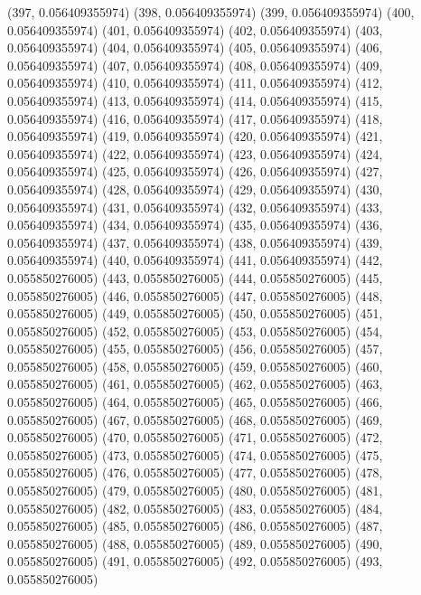 {					(397, 0.056409355974)
					(398, 0.056409355974)
					(399, 0.056409355974)
					(400, 0.056409355974)
					(401, 0.056409355974)
					(402, 0.056409355974)
					(403, 0.056409355974)
					(404, 0.056409355974)
					(405, 0.056409355974)
					(406, 0.056409355974)
					(407, 0.056409355974)
					(408, 0.056409355974)
					(409, 0.056409355974)
					(410, 0.056409355974)
					(411, 0.056409355974)
					(412, 0.056409355974)
					(413, 0.056409355974)
					(414, 0.056409355974)
					(415, 0.056409355974)
					(416, 0.056409355974)
					(417, 0.056409355974)
					(418, 0.056409355974)
					(419, 0.056409355974)
					(420, 0.056409355974)
					(421, 0.056409355974)
					(422, 0.056409355974)
					(423, 0.056409355974)
					(424, 0.056409355974)
					(425, 0.056409355974)
					(426, 0.056409355974)
					(427, 0.056409355974)
					(428, 0.056409355974)
					(429, 0.056409355974)
					(430, 0.056409355974)
					(431, 0.056409355974)
					(432, 0.056409355974)
					(433, 0.056409355974)
					(434, 0.056409355974)
					(435, 0.056409355974)
					(436, 0.056409355974)
					(437, 0.056409355974)
					(438, 0.056409355974)
					(439, 0.056409355974)
					(440, 0.056409355974)
					(441, 0.056409355974)
					(442, 0.055850276005)
					(443, 0.055850276005)
					(444, 0.055850276005)
					(445, 0.055850276005)
					(446, 0.055850276005)
					(447, 0.055850276005)
					(448, 0.055850276005)
					(449, 0.055850276005)
					(450, 0.055850276005)
					(451, 0.055850276005)
					(452, 0.055850276005)
					(453, 0.055850276005)
					(454, 0.055850276005)
					(455, 0.055850276005)
					(456, 0.055850276005)
					(457, 0.055850276005)
					(458, 0.055850276005)
					(459, 0.055850276005)
					(460, 0.055850276005)
					(461, 0.055850276005)
					(462, 0.055850276005)
					(463, 0.055850276005)
					(464, 0.055850276005)
					(465, 0.055850276005)
					(466, 0.055850276005)
					(467, 0.055850276005)
					(468, 0.055850276005)
					(469, 0.055850276005)
					(470, 0.055850276005)
					(471, 0.055850276005)
					(472, 0.055850276005)
					(473, 0.055850276005)
					(474, 0.055850276005)
					(475, 0.055850276005)
					(476, 0.055850276005)
					(477, 0.055850276005)
					(478, 0.055850276005)
					(479, 0.055850276005)
					(480, 0.055850276005)
					(481, 0.055850276005)
					(482, 0.055850276005)
					(483, 0.055850276005)
					(484, 0.055850276005)
					(485, 0.055850276005)
					(486, 0.055850276005)
					(487, 0.055850276005)
					(488, 0.055850276005)
					(489, 0.055850276005)
					(490, 0.055850276005)
					(491, 0.055850276005)
					(492, 0.055850276005)
					(493, 0.055850276005)
}
